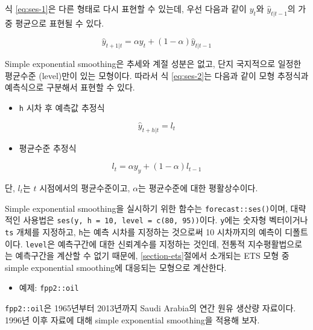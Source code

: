\documentclass[
]{book}
\providecommand{\tightlist}{%
  \setlength{\itemsep}{0pt}\setlength{\parskip}{0pt}}
\begin{document}
식 \eqref{eq:ses-1}은 다른 형태로 다시 표현할 수 있는데, 우선 다음과 같이 \(y_{t}\)와 \(\hat{y}_{t|t-1}\)의 가중 평균으로 표현될 수 있다.

\begin{equation}
\hat{y}_{t+1|t} = \alpha y_{t} + (1-\alpha) \hat{y}_{t|t-1} \label{eq:ses-2}
\end{equation}

Simple exponential smoothing은 추세와 계절 성분은 없고, 단지 국지적으로 일정한 평균수준 (level)만이 있는 모형이다. 따라서 식 \eqref{eq:ses-2}는 다음과 같이 모형 추정식과 예측식으로 구분해서 표현할 수 있다.

\begin{itemize}
\tightlist
\item
  \texttt{h} 시차 후 예측값 추정식
\end{itemize}

\begin{equation}
\hat{y}_{t+h|t} = l_{t}
\end{equation}

\begin{itemize}
\tightlist
\item
  평균수준 추정식
\end{itemize}

\begin{equation}
l_{t} = \alpha y_{y} + (1-\alpha) l_{t-1}
\end{equation}

단, \(l_{t}\)는 \(t\) 시점에서의 평균수준이고, \(\alpha\)는 평균수준에 대한 평활상수이다.

Simple exponential smoothing을 실시하기 위한 함수는 \texttt{forecast::ses()}이며, 대략적인 사용법은 \texttt{ses(y,\ h\ =\ 10,\ level\ =\ c(80,\ 95))}이다. \texttt{y}에는 숫자형 벡터이거나 \texttt{ts} 개체를 지정하고, \texttt{h}는 예측 시차를 지정하는 것으로써 10 시차까지의 예측이 디폴트이다. \texttt{level}은 예측구간에 대한 신뢰계수를 지정하는 것인데, 전통적 지수평활법으로는 예측구간을 계산할 수 없기 때문에, \ref{section-ets}절에서 소개되는 ETS 모형 중 simple exponential smoothing에 대응되는 모형으로 계산한다.

\begin{itemize}
\tightlist
\item
  예제: \texttt{fpp2::oil}
\end{itemize}

\texttt{fpp2::oil}은 1965년부터 2013년까지 Saudi Arabia의 연간 원유 생산량 자료이다. 1996년 이후 자료에 대해 simple exponential smoothing을 적용해 보자.
\end{document}
